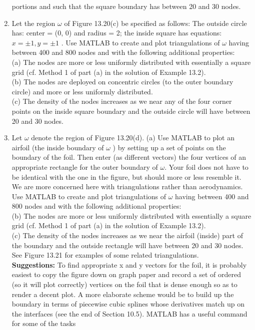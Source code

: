 \documentclass[../main.tex]{subfiles}
\begin{document}
\begin{enumerate}
portions and such that the square boundary has between 20 and 30 nodes.
	\item Let the region $\omega$ of Figure 13.20(c) be specified as follows: The outside circle has: center = 
(0, 0) and radius = 2; the inside square has equations: $x=\pm1,y=\pm1$ . Use MATLAB to create 
and plot triangulations of $\omega$ having between 400 and 800 nodes and with the following 
additional properties: 
\\
(a) The nodes are more or less uniformly distributed with essentially a square grid (cf. Method 1 
of part (a) in the solution of Example 13.2).
\\ 
(b) The nodes are deployed on concentric circles (to the outer boundary circle) and more or less 
uniformly distributed. 
\\
(c) The density of the nodes increases as we near any of the four corner points on the inside 
square boundary and the outside circle will have between 20 and 30 nodes. 
	\item Let $\omega$ denote the region of Figure 13.20(d). (a) Use MATLAB to plot an airfoil (the inside 
boundary of $\omega$ ) by setting up a set of points on the boundary of the foil. Then enter (as 
different vectors) the four vertices of an appropriate rectangle for the outer boundary of $\omega$. 
Your foil does not have to be identical with the one in the figure, but should more or less 
resemble it. We are more concerned here with triangulations rather than aerodynamics. Use 
MATLAB to create and plot triangulations of $\omega$ having between 400 and 800 nodes and with 
the following additional properties: 
\\
(b) The nodes are more or less uniformly distributed with essentially a square grid (cf. Method 
1 of part (a) in the solution of Example 13.2).
\\ 
(c) The density of the nodes increases as we near the airfoil (inside) part of the boundary and 
the outside rectangle will have between 20 and 30 nodes. See Figure 13.21 for examples of some related triangulations.
\\
\textbf{Suggestions:} To find appropriate x and y vectors for the foil, it is probably easiest to copy the 
figure down on graph paper and record a set of ordered (so it will plot correctly) vertices on the 
foil that is dense enough so as to render a decent plot. A more elaborate scheme would be to 
build up the boundary in terms of piecewise cubic splines whose derivatives match up on the 
interfaces (see the end of Section 10.5). MATLAB has a useful command for some of the tasks 

\end{enumerate}
\end{document}
